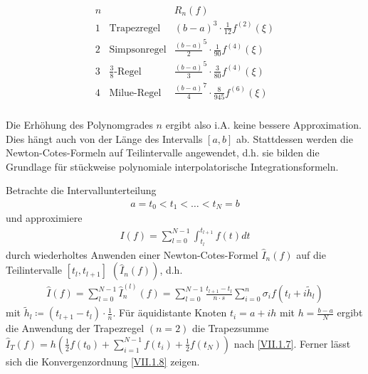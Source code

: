 \begin{gather*}\label{7.2.9}
  \begin{array}{cll}
    n & & R_n(f)\\
    1 &\text{Trapezregel} &(b-a)^3\cdot\frac{1}{12}f^{(2)}(\xi)\\
    2 &\text{Simpsonregel}&\frac{(b-a)}{2}^5\cdot\frac{1}{90}f^{(4)}(\xi)\\
    3 &\text{$\frac{3}{8}$-Regel}&\frac{(b-a)}{3}^5\cdot\frac{3}{80}f^{(4)}(\xi)\\
    4 &\text{Milue-Regel}
        &\frac{(b-a)}{4}^7\cdot\frac{8}{945}f^{(6)}(\xi)\\
  \end{array}
\end{gather*}

Die Erhöhung des Polynomgrades $n$
ergibt also
i.A. keine bessere Approximation.
Dies hängt auch von der Länge des
Intervalls $[a,b]$ ab.
Stattdessen werden die
Newton-Cotes-Formeln auf
Teilintervalle angewendet, 
d.h. sie bilden die Grundlage für
stückweise polynomiale
interpolatorische Integrationsformeln.

Betrachte die Intervallunterteilung
\begin{gather*}
  a=t_0<t_1<\ldots<t_N=b
\end{gather*}
und approximiere
\begin{gather*}
  I(f) = \sum_{l=0}^{N-1}\int_{t_l}^{t_{l+1}}f(t)dt
\end{gather*}
durch wiederholtes Anwenden einer Newton-Cotes-Formel
$\hat{I}_n(f)$ auf die Teilintervalle $[t_l, t_{l+1}]$
$(\hat{I}_n(f))$,
d.h.
\begin{gather}
  \hat{I}(f) = \sum_{l=0}^{N-1}\hat{I}_n^{(l)}(f)
  = \sum_{l=0}^{N-1}\frac{t_{l+1}-t_l}{n\cdot s}
  \sum_{i=0}^n \sigma_i f(t_l+i\widetilde{h}_l)
  \label{VII.2.11}
\end{gather}
mit $\widetilde{h}_l\coloneqq (t_{l+1}-t_l)\cdot \frac{1}{n}$.
Für äquidistante Knoten $t_i=a+ih$ mit $h=\frac{b-a}{N}$
ergibt die Anwendung der Trapezregel $(n=2)$
die Trapezsumme 
$\hat{I}_T(f) = h\left(
  \frac{1}{2}f(t_0)+\sum_{i=1}^{N-1}f(t_i) +\frac{1}{2}f(t_N)
\right)$
nach \eqref{VII.1.7}. 
Ferner lässt sich die Konvergenzordnung \eqref{VII.1.8} zeigen.


